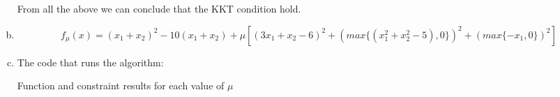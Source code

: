 \documentclass{article}
\begin{document}
\begin{enumerate}[(a)]
From all the above we can conclude that the KKT condition hold.
\item
\[
f_\mu(x) = (x_1 + x_2)^2 - 10(x_1 + x_2) + \mu [(3x_1 + x_2 - 6)^2 + (max\{(x_1^2 + x_2^2 - 5), 0\})^2 + (max\{-x_1, 0\})^2]
\]
\item The code that runs the algorithm:
\begin{scriptsize}
\begin{tcolorbox}[%
    enhanced,
    breakable,
    frame hidden,
    overlay broken = {
        \draw[line width=0.5mm, black, rounded corners]
        (frame.north west) rectangle (frame.south east);},
    ]{}
%
\end{tcolorbox}
\end{scriptsize}
Function and constraint results for each value of $\mu$
\begin{scriptsize}
\begin{tcolorbox}[%
    enhanced,
    breakable,
    frame hidden,
    overlay broken = {
        \draw[line width=0.5mm, black, rounded corners]
        (frame.north west) rectangle (frame.south east);},
    ]{}
\begingroup
\obeylines

\endgroup%
\end{tcolorbox}
\end{scriptsize}
\end{enumerate}
\end{document}
